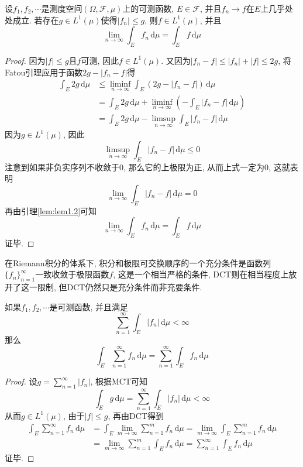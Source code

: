 \documentclass[cn, 12pt, math=mtpro2, bibstyle=apa, blue, twocol]{elegantbook}
\newcommand{\F}{\mathcal{F}}
\newcommand{\limn}{\lim_{n\to\infty}}
\newcommand{\du}{\,\text{d}\mu}
\begin{document}
\begin{theorem}
  设$f_1,f_2,\cdots$是测度空间$(\Omega,\F,\mu)$上的可测函数, $E\in\F$, 并且$f_n\to f$在$E$上几乎处处成立. 若存在$g\in L^1(\mu)$使得$|f_n|\leq g$, 则$f\in L^1(\mu)$, 并且
  $$\limn \int_E f_n\du=\int_E f\du$$
\end{theorem}
\begin{proof}
  因为$|f|\leq g$且$f$可测, 因此$f\in L^1(\mu)$. 又因为$|f_n-f|\leq |f_n|+|f|\leq 2g$, 将Fatou引理应用于函数$2g-|f_n-f|$得
  \begin{align*}
  \int_E2g\du&\leq\liminf_{n\to\infty}\int_E(2g-|f_n-f|)\du \\
  &=\int_E2g\du+\liminf_{n\to\infty}\left(-\int_E|f_n-f|\du \right) \\
  &=\int_E2g\du-\limsup_{n\to\infty}\int_E|f_n-f|\du
  \end{align*}
  因为$g\in L^1(\mu)$, 因此
  $$\limsup_{n\to\infty}\int_E|f_n-f|\du\leq0$$
  注意到如果非负实序列不收敛于0, 那么它的上极限为正, 从而上式一定为0, 这就表明
  $$\limn \int_E|f_n-f|\du=0$$
  再由引理\ref{lem:lem1.2}可知
  $$ \limn \int_E f_n\du=\int_E f\du$$
  证毕.
\end{proof}
在Riemann积分的体系下, 积分和极限可交换顺序的一个充分条件是函数列$\{f_n\}_{n=1}^\infty$一致收敛于极限函数$f$, 这是一个相当严格的条件, DCT则在相当程度上放开了这一限制, 但DCT仍然只是充分条件而非充要条件.
\begin{corollary}
如果$f_1,f_2,\cdots$是可测函数, 并且满足
$$\sum_{n=1}^{\infty}\int_E|f_n|\du<\infty$$
那么
$$\int_E\sum_{n=1}^{\infty}f_n\du=\sum_{n=1}^{\infty}\int_Ef_n\du$$
\end{corollary}
\begin{proof}
  设$g=\sum_{n=1}^{\infty}|f_n|$, 根据MCT可知
  $$\int_Eg\du=\sum_{n=1}^{\infty}\int_E|f_n|\du<\infty$$
  从而$g\in L^1(\mu)$, 由于$|f|\leq g$, 再由DCT得到
  \begin{align*}
  \int_E\sum_{n=1}^{\infty}f_n\du&=\int_E\lim_{m\to\infty}\sum_{n=1}^{m}f_n\du=\lim_{m\to\infty}\int_E\sum_{n=1}^{m}f_n\du \\
  &=\lim_{m\to\infty}\sum_{n=1}^{m}\int_Ef_n\du=\sum_{n=1}^{\infty}\int_Ef_n\du
  \end{align*}
  证毕.
\end{proof}
\end{document}

